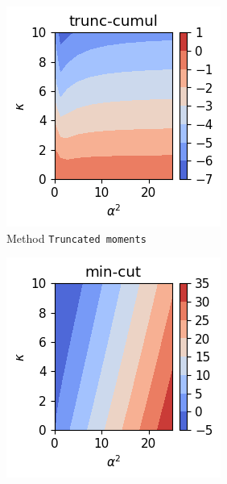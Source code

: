 \begin{figure}[h!]
    \centering
    \begin{subfigure}{0.32\linewidth}
        \centering
        \includegraphics[width=\linewidth]{Pics/H_Self_Kerr_and_losses_1_p_3_rule_trunc-cumul.pdf}
        \caption{Method \texttt{Truncated moments}}
        \label{fig:H_Self_Kerr_and_losses_1_p_3_rule_trunc-cumul}
    \end{subfigure}
    \hfill
    \begin{subfigure}{0.32\linewidth}
        \centering
        \includegraphics[width=\linewidth]{Pics/H_Self_Kerr_and_losses_1_p_3_rule_min-cut.pdf}

\end{subfigure}
\end{figure}
